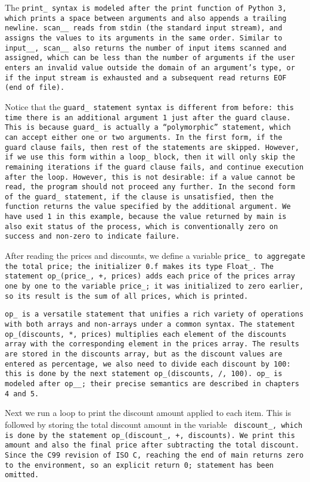 The \tt{print_} syntax is modeled after the \tt{print} function of Python 3,
which prints a space between arguments and also appends a trailing newline.
\tt{scan__} reads from \tt{stdin} (the standard input stream),
and assigns the values to its arguments in the same order.
Similar to \tt{input__}, \tt{scan__} also returns
the number of input items scanned and assigned,
which can be less than the number of arguments if the user
enters an invalid value outside the domain of an argument's type,
or if the input stream is exhausted and a
subsequent read returns \tt{EOF} (end of file).

Notice that the \tt{guard_} statement syntax is different from before:
this time there is an additional argument \tt{1} just after the guard clause.
This is because \tt{guard_} is actually a ``polymorphic'' statement,
which can accept either one or two arguments.
In the first form, if the guard clause fails,
then rest of the statements are skipped.
However, if we use this form within a \tt{loop_} block,
then it will only skip the remaining iterations if the guard clause fails,
and continue execution after the loop.
However, this is not desirable:
if a value cannot be read, the program should not proceed any further.
In the second form of the \tt{guard_} statement, if the clause is unsatisfied,
then the function returns the value specified by the additional argument.
We have used \tt{1} in this example,
because the value returned by \tt{main} is also exit status of the process,
which is conventionally zero on success and non-zero to indicate failure.

After reading the prices and discounts,
we define a variable \tt{price_} to aggregate the total price;
the initializer \tt{0.f} makes its type \tt{Float_}.
The statement \tt{op_(price_, +, prices)} adds each price of
the \tt{prices} array one by one to the variable \tt{price_};
it was initialized to zero earlier,
so its result is the sum of all prices, which is printed.

\tt{op_} is a versatile statement that unifies a rich variety
of operations with both arrays and non-arrays under a common syntax.
The statement \tt{op_(discounts, *, prices)} multiplies each element of the
\tt{discounts} array with the corresponding element in the \tt{prices} array.
The results are stored in the \tt{discounts} array,
but as the discount values are entered as percentage,
we also need to divide each discount by 100:
this is done by the next statement \tt{op_(discounts, /, 100)}.
\tt{op_} is modeled after \tt{op__};
their precise semantics are described in chapters 4 and 5.

Next we run a loop to print the discount amount applied to each item.
This is followed by storing the total discount amount in the variable \tt
{discount_}, which is done by the statement \tt{op_(discount_, +, discounts)}.
We print this amount and also the final price
after subtracting the total discount.
Since the C99 revision of ISO C,
reaching the end of \tt{main} returns zero to the environment,
so an explicit \tt{return 0;} statement has been omitted.
